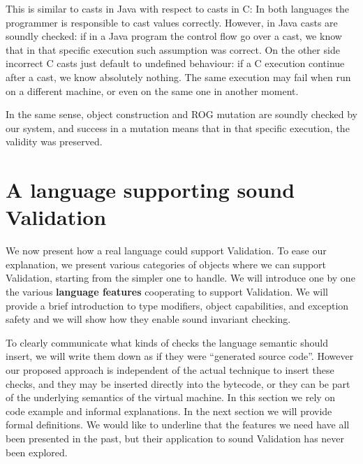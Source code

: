 This is similar to casts in Java with respect to casts in C:
In both languages the programmer is responsible to cast values correctly.
However, in Java casts are soundly checked: if in a Java program the control flow go over a cast,
 we know that in that specific
execution such assumption was correct.
On the other side incorrect C casts just default to undefined behaviour:
if a C execution continue after a cast, we know absolutely nothing. The same execution
 may fail when run on a different machine, 
or even on the same one in another moment.

In the same sense, object construction and ROG mutation are soundly checked by our system,
and success in a mutation means that in that specific execution, the validity was preserved.




%
%  
% 
%
%
%
%
%
%
%
%
%
%
%
%
%
%
%
%
%



\saveSpace
\section{A language supporting sound Validation}
\label{s:language}
\saveSpace
We now present how a real language could support
Validation. To ease our explanation, we present various categories
of objects where we can support Validation, starting from the simpler one to handle.
We will introduce one by one the various
\textbf{language features} cooperating
to support Validation.%
We will provide a brief introduction to type modifiers, object capabilities, and exception safety and we will show how they enable sound invariant checking.

To clearly communicate what kinds of checks the language semantic should insert,
 we will write them down as if they were ``generated source code''. 
However our proposed approach is independent of the actual technique to insert these checks, and they may be inserted directly into the bytecode, or they can be part of the underlying semantics of the virtual machine.
In this section we rely on code example and informal explanations. In the next section we will provide formal definitions.
We would like to underline that the
features we need have all been presented in the past, but their application to sound Validation has never been explored.



